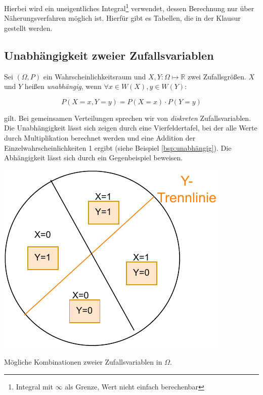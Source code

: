 \documentclass{tufte-handout}
\theoremstyle{own}
\begin{document}
Hierbei wird ein uneigentliches Integral\footnote{Integral mit $\infty$ als Grenze, Wert nicht einfach berechenbar} verwendet, dessen Berechnung nur über Näherungsverfahren möglich ist. 
Hierfür gibt es Tabellen, die in der Klausur gestellt werden.

\subsection{Unabhängigkeit zweier Zufallsvariablen}

Sei $(\Omega, P)$ ein Wahrscheinlichkeitsraum und $X,Y : \Omega \mapsto \mathbb{R}$ zwei Zufallsgrößen.
$X$ und $Y$ heißen \textit{unabhängig}, wenn $\forall x \in W(X), y \in W(Y)$:

\begin{equation}
	P(X=x, Y=y) = P(X=x) \cdot P(Y=y)
\end{equation}

gilt. Bei gemeinsamen Verteilungen sprechen wir von \textit{diskreten} Zufallsvariablen.
Die Unabhängigkeit lässt sich zeigen durch eine Vierfeldertafel, bei der alle
Werte durch Multiplikation berechnet werden und eine Addition der Einzelwahrscheinlichkeiten
1 ergibt (siehe Beispiel \ref{bsp:unabhängig}). Die Abhängigkeit lässt sich 
durch ein Gegenbeispiel beweisen.

\begin{marginfigure}
  \includegraphics{zweizufallsvariablen}
  \caption{Mögliche Kombinationen zweier Zufallsvariablen in $\Omega$.}
\end{marginfigure}
\end{document}
